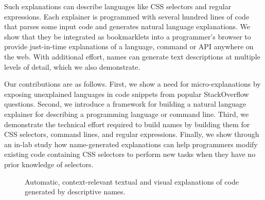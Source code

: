 Such explanations can describe languages like CSS selectors and regular expressions.
Each explainer is programmed with several hundred lines of code that parses some input code and generates natural language explanations.
We show that they be integrated as bookmarklets into a programmer's browser to provide just-in-time explanations of a language, command or API anywhere on the web.
With additional effort, \glspl{name} can generate text descriptions at multiple levels of detail, which we also demonstrate.

Our contributions are as follows.
First, we show a need for micro-explanations by exposing unexplained languages in code snippets from popular StackOverflow questions.
Second, we introduce a framework for building a natural language explainer for describing a programming language or command line.
Third, we demonstrate the technical effort required to build \glspl{name} by building them for CSS selectors, command lines, and regular expressions.
Finally, we show through an in-lab study how \gls{name}-generated explanations can help programmers modify existing code containing CSS selectors to perform new tasks when they have no prior knowledge of selectors. 

\begin{figure}[!t]
    \centering
    \label{fig:tutorons}
    \caption{Automatic, context-relevant textual and visual explanations of code generated by descriptive \glspl{name}.}
\end{figure}
